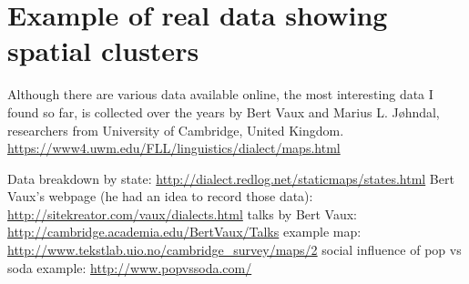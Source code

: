 \section{Example of real data showing spatial clusters}

Although there are various data available online, the most interesting data I found so far, is  collected over the years by Bert Vaux and  Marius L. Jøhndal, researchers from University of Cambridge, United Kingdom. 
\url{https://www4.uwm.edu/FLL/linguistics/dialect/maps.html}

Data breakdown by state: \url{http://dialect.redlog.net/staticmaps/states.html}
Bert Vaux’s webpage (he had an idea to record those data): \url{http://sitekreator.com/vaux/dialects.html} 
talks by Bert Vaux: \url{http://cambridge.academia.edu/BertVaux/Talks}
example map: \url{http://www.tekstlab.uio.no/cambridge_survey/maps/2} 
social influence of pop vs soda example: \url{http://www.popvssoda.com/} 

